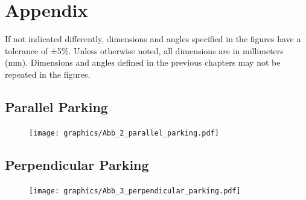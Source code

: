 \appendix
\chapter{Appendix}
If not indicated differently, dimensions and angles specified in the figures
have a tolerance of ±5\%. Unless otherwise noted, all dimensions are in
millimeters (mm). Dimensions and angles defined in the previous chapters may
not be repeated in the figures.

\section{Parallel Parking}
\label{fig_parallel_parking}
\begin{figure}[H]
	\begin{center}
		\centering\texttt{[image: graphics/Abb\_2\_parallel\_parking.pdf]}
	\end{center}
\end{figure}

\section{Perpendicular Parking}
\begin{figure}[H]
	\label{fig_perpendicular_parking}
	\begin{center}
		\centering\texttt{[image: graphics/Abb\_3\_perpendicular\_parking.pdf]}
	\end{center}
\end{figure}

